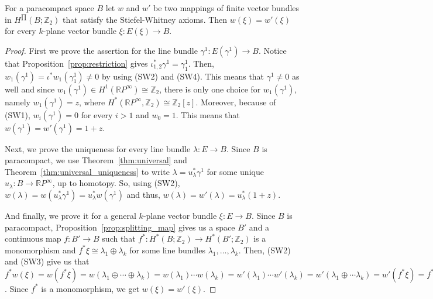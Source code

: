 \begin{theorem} For a paracompact space $B$ let $w$ and $w'$ be two mappings of finite vector bundles in $H^{\prod}(B;\mathbb{Z}_2)$ that satisfy the Stiefel-Whitney axioms. Then $w(\xi)=w'(\xi)$ for every $k$-plane vector bundle $\xi:E(\xi)\to B$.
\end{theorem}
\begin{proof} First we prove the assertion for the line bundle $\gamma^1:E(\gamma^1)\to B$. Notice that Proposition~\ref{prop:restriction} gives $\iota_{1,2}^*\gamma^1=\gamma_1^1$. Then, $w_1(\gamma^1)=\iota^*w_1(\gamma_1^1)\neq0$ by using (SW2) and (SW4). This means that $\gamma^1\neq0$ as well and since $w_1(\gamma^1)\in H^1(\mathbb{R}P^{\infty})\cong\mathbb{Z}_2$, there is only one choice for $w_1(\gamma^1)$, namely $w_1(\gamma^1)=z$, where $H^*(\mathbb{R}P^{\infty},\mathbb{Z}_2)\cong\mathbb{Z}_2[z]$. Moreover, because of (SW1), $w_i(\gamma^1)=0$ for every $i>1$ and $w_0=1$. This means that $w(\gamma^1)=w'(\gamma^1)=1+z$.

Next, we prove the uniqueness for every line bundle $\lambda:E\to B$. Since $B$ is paracompact, we use Theorem~\ref{thm:universal} and Theorem~\ref{thm:universal_uniqueness} to write $\lambda=u_{\lambda}^*\gamma^1$ for some unique $u_{\lambda}:B\to\mathbb{R}P^{\infty}$, up to homotopy. So, using (SW2), $w(\lambda)=w(u_{\lambda}^*\gamma^1)=u_{\lambda}^*w(\gamma^1)$ and thus, $w(\lambda)=w'(\lambda)=u_{\lambda}^*(1+z)$.

And finally, we prove it for a general $k$-plane vector bundle $\xi:E\to B$. Since $B$ is paracompact, Proposition~\ref{prop:splitting_map} gives us a space $B'$ and a continuous map $f:B'\to B$ such that $f^*:H^*(B;\mathbb{Z}_2)\to H^*(B';\mathbb{Z}_2)$ is a monomorphism and $f^*\xi\cong\lambda_1\oplus\lambda_k$ for some line bundles $\lambda_1,\ldots,\lambda_k$. Then, (SW2) and (SW3) give us that $f^*w(\xi)=w(f^*\xi)=w(\lambda_1\oplus\cdots\oplus\lambda_k)=w(\lambda_1)\cdots w(\lambda_k)=w'(\lambda_1)\cdots w'(\lambda_k)=w'(\lambda_1\oplus\cdots\lambda_k)=w'(f^*\xi)=f^*w'(\xi)$. Since $f^*$ is a monomorphism, we get $w(\xi)=w'(\xi)$.
\end{proof}

